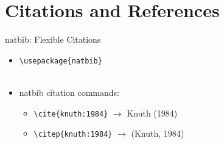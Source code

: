 \section{Citations and References}
\begin{frame}[fragile]{natbib: Flexible Citations}
  \begin{itemize}
    \item \lstinline|\usepackage{natbib}|\\
    ~
     \item natbib citation commands:
     \begin{itemize}
     \item \lstinline|\cite{knuth:1984}| $\rightarrow$ Knuth (1984)
     \item \lstinline|\citep{knuth:1984}| $\rightarrow$ (Knuth, 1984)
     \end{itemize}
     
  \end{itemize}
\end{frame}

